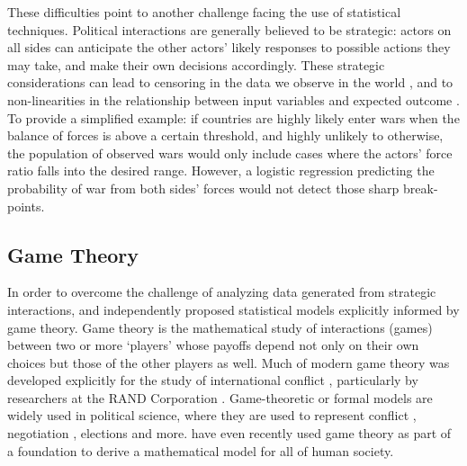 These difficulties point to another challenge facing the use of statistical techniques. Political interactions are generally believed to be strategic: actors on all sides can anticipate the other actors' likely responses to possible actions they may take, and make their own decisions accordingly. These strategic considerations can lead to censoring in the data we observe in the world \citep{smith_1999}, and to non-linearities in the relationship between input variables and expected outcome \citep{signorino_1999}. To provide a simplified example: if countries are highly likely enter wars when the balance of forces is above a certain threshold, and highly unlikely to otherwise, the population of observed wars would only include cases where the actors' force ratio falls into the desired range. However, a logistic regression predicting the probability of war from both sides' forces would not detect those sharp break-points. 



\subsection*{Game Theory}\label{formal-game-theoretic-models}

In order to overcome the challenge of analyzing data generated from strategic interactions, \citet{signorino_1999} and \citet{smith_1999} independently proposed statistical models explicitly informed by game theory. Game theory is the mathematical study of interactions (games) between two or more `players' whose payoffs depend not only on their own choices but those of the other players as well. Much of modern game theory was developed explicitly for the study of international conflict \citep{myerson_2009}, particularly by researchers at the RAND Corporation \citep{gates_1997}. Game-theoretic or formal models are widely used in political science, where they are used to represent conflict \citep[e.g.][]{powell_2006}, negotiation \citep[e.g.][]{brams_2003}, elections \citep[e.g.][]{coughlin_1981} and more. \citet{gintis_2015} have even recently used game theory as part of a foundation to derive a mathematical model for all of human society.

